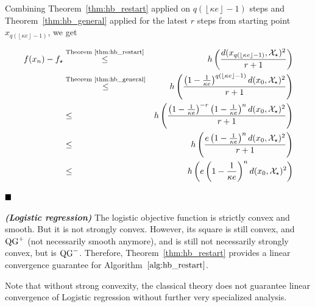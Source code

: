         Combining Theorem~\ref{thm:hb_restart} applied on $q \left(\left\lfloor \kappa e \right\rfloor - 1\right)$ steps and Theorem~\ref{thm:hb_general} applied for the latest $r$ steps from starting point $x_{q \left(\left\lfloor \kappa e \right\rfloor - 1\right)}$, we get

        \begin{eqnarray*}
             f(x_n) - f_\star & \overset{\text{Theorem~\ref{thm:hb_restart}}}{\leq} & h\left(\frac{d(x_{q \left(\left\lfloor \kappa e \right\rfloor - 1\right)}, \mathcal{X}_\star)^2}{r+1} \right) \\
             & \overset{\text{Theorem~\ref{thm:hb_general}}}{\leq} & h\left(\frac{\left(1 - \frac{1}{\kappa e}\right)^{q \left(\left\lfloor \kappa e \right\rfloor - 1\right)} d(x_0, \mathcal{X}_\star)^2}{r+1} \right) \\
             & \leq & h\left(\frac{\left(1 - \frac{1}{\kappa e}\right)^{-r} \left(1 - \frac{1}{\kappa e}\right)^{n} d(x_0, \mathcal{X}_\star)^2}{r+1} \right) \\
             & \leq & h\left(\frac{e \left(1 - \frac{1}{\kappa e}\right)^n d(x_0, \mathcal{X}_\star)^2}{r+1} \right) \\
             & \leq & h\left(e \left(1 - \frac{1}{\kappa e}\right)^n d(x_0, \mathcal{X}_\star)^2 \right)
        \end{eqnarray*}

    $\hfill\blacksquare$

    \begin{Ex}\textbf{\emph{(Logistic regression)}}
        The logistic objective function is strictly convex and smooth.
        But it is not strongly convex.
        However, its square is still convex, and $\operatorname{QG}^+$ (not necessarily smooth anymore), and is still not necessarily strongly convex, but is $\operatorname{QG}^-$.
        Therefore, Theorem~\ref{thm:hb_restart} provides a linear convergence guarantee for Algorithm~$\ref{alg:hb_restart}$.

        Note that without strong convexity, the classical theory does not guarantee linear convergence of Logistic regression without further very specialized analysis.
    \end{Ex}
